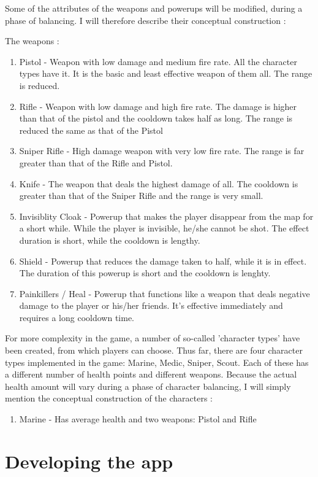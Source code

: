 \documentclass{article}
\begin{document}
Some of the attributes of the weapons and powerups will be modified, during a
phase of balancing. I will therefore describe their conceptual construction : 

The weapons : 
\begin{enumerate}
  \item Pistol - Weapon with low damage and medium fire rate. All the character
  types have it. It is the basic and least effective weapon of them all. The
  range is reduced.
  \item Rifle - Weapon with low damage and high fire rate. The damage is higher
  than that of the pistol and the cooldown takes half as long. The range is
  reduced the same as that of the Pistol
  \item Sniper Rifle - High damage weapon with very low fire rate. The range is
  far greater than that of the Rifle and Pistol.
  \item Knife - The weapon that deals the highest damage of all. The cooldown is
  greater than that of the Sniper Rifle and the range is very small. 
  \item Invisiblity Cloak - Powerup that makes the player disappear from the
  map for a short while. While the player is invisible, he/she cannot be shot.
  The effect duration is short, while the cooldown is lengthy.
  \item Shield - Powerup that reduces the damage taken to half, while it is in
  effect. The duration of this powerup is short and the cooldown is lenghty.
  \item Painkillers / Heal - Powerup that functions like a weapon that deals
  negative damage to the player or his/her friends. It's effective immediately
  and requires a long cooldown time.
\end{enumerate}

For more complexity in the game, a number of so-called 'character types' have
been created, from which players can choose. Thus far, there are four character
types implemented in the game: Marine, Medic, Sniper, Scout. Each of these has a
different number of health points and different weapons. Because the actual
health amount will vary during a phase of character balancing, I will simply
mention the conceptual construction of the characters :
\begin{enumerate}
  \item Marine - Has average health and two weapons: Pistol and Rifle
\end{enumerate}


\section{Developing the app}
\end{document}
